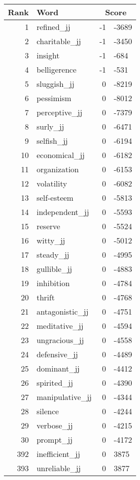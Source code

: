 \begin{longtable}[!htbp]{| rlr@{.}l |}
    \hline
    \textbf{Rank} & \textbf{Word} & \multicolumn{2}{c|}{\textbf{Score}} \\
    \hline
    \endhead
    1 & refined\_jj & -1 & -3689 \\
    2 & charitable\_jj & -1 & -3450 \\
    3 & insight & -1 & -684 \\
    4 & belligerence & -1 & -531 \\
    5 & sluggish\_jj & 0 & -8219 \\
    6 & pessimism & 0 & -8012 \\
    7 & perceptive\_jj & 0 & -7379 \\
    8 & surly\_jj & 0 & -6471 \\
    9 & selfish\_jj & 0 & -6194 \\
    10 & economical\_jj & 0 & -6182 \\
    11 & organization & 0 & -6153 \\
    12 & volatility & 0 & -6082 \\
    13 & self-esteem & 0 & -5813 \\
    14 & independent\_jj & 0 & -5593 \\
    15 & reserve & 0 & -5524 \\
    16 & witty\_jj & 0 & -5012 \\
    17 & steady\_jj & 0 & -4995 \\
    18 & gullible\_jj & 0 & -4883 \\
    19 & inhibition & 0 & -4784 \\
    20 & thrift & 0 & -4768 \\
    21 & antagonistic\_jj & 0 & -4751 \\
    22 & meditative\_jj & 0 & -4594 \\
    23 & ungracious\_jj & 0 & -4558 \\
    24 & defensive\_jj & 0 & -4489 \\
    25 & dominant\_jj & 0 & -4412 \\
    26 & spirited\_jj & 0 & -4390 \\
    27 & manipulative\_jj & 0 & -4344 \\
    28 & silence & 0 & -4244 \\
    29 & verbose\_jj & 0 & -4215 \\
    30 & prompt\_jj & 0 & -4172 \\
    392 & inefficient\_jj & 0 & 3875 \\
    393 & unreliable\_jj & 0 & 3877 \\

\end{longtable}
